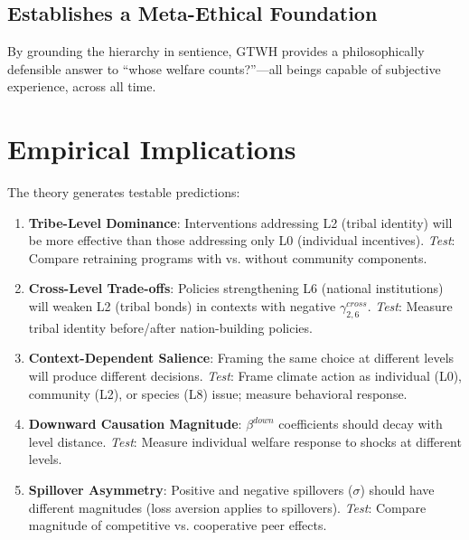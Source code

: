 \documentclass[12pt,a4paper]{article}
\begin{document}
\subsection{Establishes a Meta-Ethical Foundation}

By grounding the hierarchy in sentience, GTWH provides a philosophically 
defensible answer to ``whose welfare counts?''---all beings capable of 
subjective experience, across all time.

\section{Empirical Implications}
\label{sec:empirical}

The theory generates testable predictions:

\begin{enumerate}
\item \textbf{Tribe-Level Dominance}: Interventions addressing L2 (tribal identity) 
will be more effective than those addressing only L0 (individual incentives).
\textit{Test}: Compare retraining programs with vs. without community components.

\item \textbf{Cross-Level Trade-offs}: Policies strengthening L6 (national institutions) 
will weaken L2 (tribal bonds) in contexts with negative $\gamma^{cross}_{2,6}$.
\textit{Test}: Measure tribal identity before/after nation-building policies.

\item \textbf{Context-Dependent Salience}: Framing the same choice at different 
levels will produce different decisions.
\textit{Test}: Frame climate action as individual (L0), community (L2), or 
species (L8) issue; measure behavioral response.

\item \textbf{Downward Causation Magnitude}: $\beta^{down}$ coefficients 
should decay with level distance.
\textit{Test}: Measure individual welfare response to shocks at different levels.

\item \textbf{Spillover Asymmetry}: Positive and negative spillovers ($\sigma$) 
should have different magnitudes (loss aversion applies to spillovers).
\textit{Test}: Compare magnitude of competitive vs. cooperative peer effects.
\end{enumerate}
\end{document}
